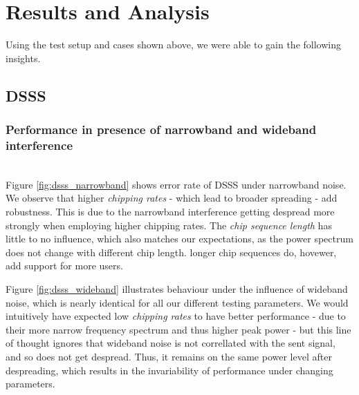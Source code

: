 \section{Results and Analysis}
	Using the test setup and cases shown above, we were able to gain the following insights.
	\subsection{DSSS}
		\subsubsection{Performance in presence of narrowband and wideband interference}~\\
			Figure \ref{fig:dsss_narrowband} shows error rate of DSSS under narrowband noise. We observe that higher \emph{chipping rates} - which lead to broader spreading - add robustness.
			This is due to the narrowband interference getting despread more strongly when employing higher chipping rates.
			The \emph{chip sequence length} has little to no influence, which also matches our expectations, as the power spectrum does not change with different chip length. longer chip sequences do, hovewer, add support for more users.
			
			Figure \ref{fig:dsss_wideband} illustrates behaviour under the influence of wideband noise, which is nearly identical for all our different testing parameters.
			We would intuitively have expected low \emph{chipping rates} to have better performance - due to their more narrow frequency spectrum and thus higher peak power - but this line of thought ignores that wideband noise is not correllated with the sent signal, and so does not get despread. Thus, it remains on the same power level after despreading, which results in the invariability of performance under changing parameters.
			
